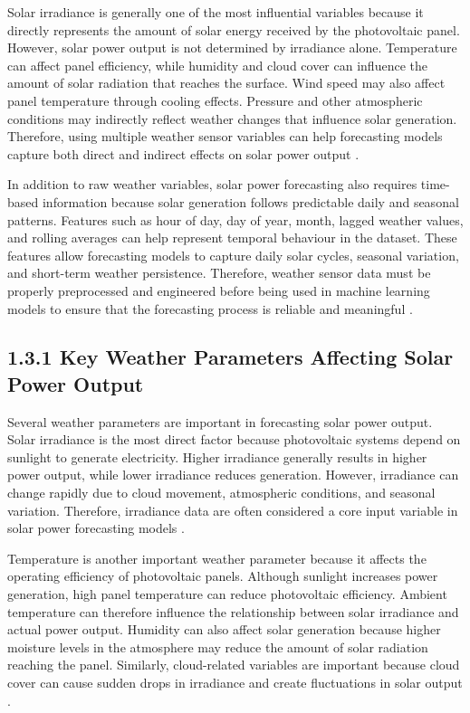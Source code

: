Solar irradiance is generally one of the most influential variables because it directly represents the amount of solar energy received by the photovoltaic panel. However, solar power output is not determined by irradiance alone. Temperature can affect panel efficiency, while humidity and cloud cover can influence the amount of solar radiation that reaches the surface. Wind speed may also affect panel temperature through cooling effects. Pressure and other atmospheric conditions may indirectly reflect weather changes that influence solar generation. Therefore, using multiple weather sensor variables can help forecasting models capture both direct and indirect effects on solar power output \parencite{CarvalhoJunior2025, Pongphaw2025, TsaiLo2025}.

In addition to raw weather variables, solar power forecasting also requires time-based information because solar generation follows predictable daily and seasonal patterns. Features such as hour of day, day of year, month, lagged weather values, and rolling averages can help represent temporal behaviour in the dataset. These features allow forecasting models to capture daily solar cycles, seasonal variation, and short-term weather persistence. Therefore, weather sensor data must be properly preprocessed and engineered before being used in machine learning models to ensure that the forecasting process is reliable and meaningful \parencite{JnanaVarshitha2025, Eren2025, Duvuru2026}.

\subsection{1.3.1  Key Weather Parameters Affecting Solar Power Output}

Several weather parameters are important in forecasting solar power output. Solar irradiance is the most direct factor because photovoltaic systems depend on sunlight to generate electricity. Higher irradiance generally results in higher power output, while lower irradiance reduces generation. However, irradiance can change rapidly due to cloud movement, atmospheric conditions, and seasonal variation. Therefore, irradiance data are often considered a core input variable in solar power forecasting models \parencite{CarvalhoJunior2025, TsaiLo2025}.

Temperature is another important weather parameter because it affects the operating efficiency of photovoltaic panels. Although sunlight increases power generation, high panel temperature can reduce photovoltaic efficiency. Ambient temperature can therefore influence the relationship between solar irradiance and actual power output. Humidity can also affect solar generation because higher moisture levels in the atmosphere may reduce the amount of solar radiation reaching the panel. Similarly, cloud-related variables are important because cloud cover can cause sudden drops in irradiance and create fluctuations in solar output \parencite{Pongphaw2025, Eren2025}.

